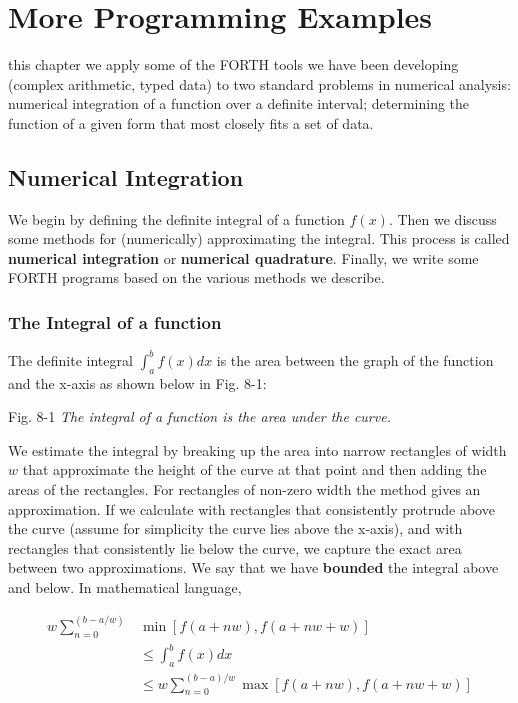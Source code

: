 \chapter{More Programming Examples}

 this chapter we apply some of the FORTH tools we have been developing (complex arithmetic, typed data) to two standard problems in numerical analysis: numerical integration of a function over a definite interval; determining the function of a given form that most closely fits a set of data.

\section{Numerical Integration}
We begin by defining the definite integral of a function $f(x)$. Then we discuss some methods for (numerically) approximating the integral. This process is called \textbf{numerical integration} or \textbf{numerical quadrature}. Finally, we write some FORTH programs based on the various methods we describe.

\subsection{The Integral of a function}
The definite integral $\int_{a}^{b}f(x) dx$ is the area between the graph of the function and the x-axis as shown below in Fig. 8-1:

Fig. 8-1 \textit{The integral of a function is the area under the curve.}

We estimate the integral by breaking up the area into narrow rectangles of width $w$ that approximate the height of the curve at that point and then adding the areas of the rectangles. For rectangles of non-zero width the method gives an approximation. If we calculate with rectangles that consistently protrude above the curve (assume for simplicity the curve lies above the x-axis), and with rectangles that consistently lie below the curve, we capture the exact area between two approximations. We say that we have \textbf{bounded} the integral above and below. In mathematical language,

\begin{equation}
    \begin{split}
    w \sum_{n=0}^{(b-a/w)} & \min[f(a+nw),f(a+nw+w)] \\
    & \leq \int_{a}^{b}f(x) dx \\
    & \leq w \sum_{n=0}^{(b-a)/w} \max[f(a+nw),f(a+nw+w)]
    \end{split}
\end{equation}

